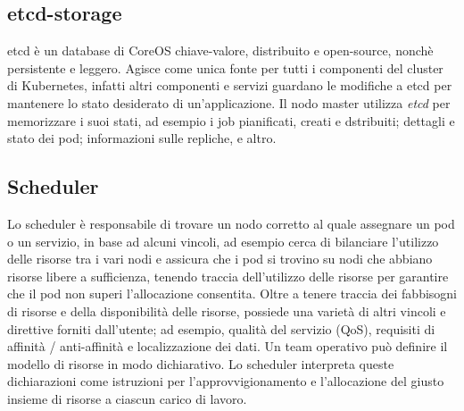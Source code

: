 \documentclass[12pt, a4paper]{report}
\begin{document}
\subsection{etcd-storage}
etcd è un database di CoreOS chiave-valore, distribuito e open-source, nonchè persistente e leggero. Agisce come unica fonte per tutti i componenti del cluster di Kubernetes, infatti altri componenti e servizi guardano le modifiche a etcd per mantenere lo stato desiderato di un'applicazione. Il nodo master utilizza \textit{etcd} per memorizzare i suoi stati, ad esempio i job pianificati, creati e dstribuiti; dettagli e stato dei pod; informazioni sulle repliche, e altro.
\subsection{Scheduler}
Lo scheduler è responsabile di trovare un nodo corretto al quale assegnare un pod o un servizio, in base ad alcuni vincoli, ad esempio cerca di bilanciare l'utilizzo delle risorse tra i vari nodi e assicura che i pod si trovino su nodi che abbiano risorse libere a sufficienza, tenendo traccia dell'utilizzo delle risorse per garantire che il pod non superi l'allocazione consentita. Oltre a tenere traccia dei fabbisogni di risorse e della disponibilità delle risorse, possiede una varietà di altri vincoli e direttive forniti dall'utente; ad esempio, qualità del servizio (QoS), requisiti di affinità / anti-affinità e localizzazione dei dati. Un team operativo può definire il modello di risorse in modo dichiarativo. Lo scheduler interpreta queste dichiarazioni come istruzioni per l'approvvigionamento e l'allocazione del giusto insieme di risorse a ciascun carico di lavoro.
\end{document}
